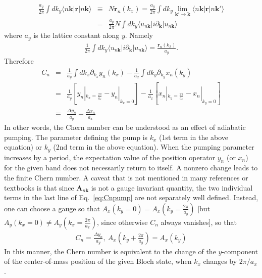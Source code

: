 \begin{eqnarray}
	\frac{a_y}{2\pi} \int d k_y \langle n\mathbf k | \mathbf r | n\mathbf k\rangle &\equiv& N \mathbf r_{n} (k_x) = \frac{a_y}{2\pi} \int d k_y \lim_{\mathbf k'\rightarrow \mathbf k} \langle n\mathbf k | \mathbf r | n\mathbf k'\rangle \\\nonumber
	&=& \frac{a_y}{2\pi} N \int dk_y \langle u_{n\mathbf k}| i\partial_{\mathbf k} |u_{n \mathbf k}\rangle
\end{eqnarray}
where $a_y$ is the lattice constant along $y$. Namely
\begin{eqnarray}\label{eq:intdkyA}
\frac{1}{2\pi} \int dk_y \langle u_{n\mathbf k}| i\partial_{\mathbf k} |u_{n \mathbf k}\rangle = \frac{\mathbf r_n(k_x)}{a_y}.
\end{eqnarray}
Therefore
\begin{eqnarray}\label{eq:Cnpump}
	C_n &=& \frac{1}{a_y} \int dk_x \partial_{k_x} y_n(k_x) - \frac{1}{a_x} \int dk_y \partial_{k_y} x_n(k_y) \\\nonumber
	&=& \frac{1}{a_y} \left[y_n|_{k_x = \frac{2\pi}{a_x}} - y_n|_{k_x = 0} \right] -  \frac{1}{a_x} \left[x_n|_{k_y = \frac{2\pi}{a_x}} - x_n|_{k_y = 0} \right] \\\nonumber
	&\equiv &\frac{\Delta y_n}{a_y} - \frac{\Delta x_n}{a_x}
\end{eqnarray}
In other words, the Chern number can be understood as an effect of adiabatic pumping. The parameter defining the pump is $k_x$ (1st term in the above equation) or $k_y$ (2nd term in the above equation). When the pumping parameter increases by a period, the expectation value of the position operator $y_n$ (or $x_n$) for the given band does not necessarily return to itself. A nonzero change leads to the finite Chern number. A caveat that is not mentioned in many references or textbooks is that since $\mathbf{A}_{n\mathbf k}$ is not a gauge invariant quantity, the two individual terms in the last line of Eq.~\eqref{eq:Cnpump} are not separately well defined. Instead, one can choose a gauge so that $A_x(k_y = 0) = A_{x}(k_y = \frac{2\pi}{a_y})$ [but $A_y(k_x = 0) \neq A_{y}(k_x = \frac{2\pi}{a_x})$, since otherwise $C_n$ always vanishes], so that
\begin{eqnarray}
	C_n = \frac{\Delta y_n}{a_y},~ A_x\left(k_y + \frac{2\pi}{a_y}\right) = A_x(k_y)
\end{eqnarray}
In this manner, the Chern number is equivalent to the change of the $y$-component of the center-of-mass position of the given Bloch state, when $k_x$ changes by $2\pi/a_x$.

